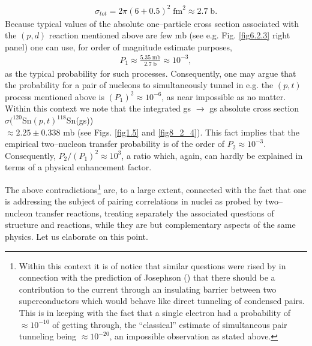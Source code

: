 \begin{align}
\sigma_{tot}=2\pi(6+0.5)^2\;\text{fm}^2\approx 2.7\;\text{b}.
\end{align}
Because typical values of the absolute one--particle cross section associated  with the $(p,d)$ reaction mentioned above are few mb (see e.g. Fig. \ref{fig6.2.3} right panel) one can use, for order of magnitude estimate purposes,  
\begin{align}
P_1\approx\frac{5.35\; \text{mb}}{2.7\;\text{b}}\approx 10^{-3},
\end{align}
as the typical probability for such processes. Consequently, one may argue that the probability for a  pair of nucleons to simultaneously tunnel in e.g. the $(p,t)$ process mentioned above is $(P_1)^2\approx10^{-6}$, as near impossible as no matter. Within this context we note that the integrated gs $\rightarrow$ gs absolute cross section $\sigma(^{120}$Sn$(p,t)^{118}$Sn(gs))\\$\approx 2.25 \pm$0.338 mb (see Figs. \ref{fig1.5} and \ref{fig8_2_4}). This fact implies that the empirical two--nucleon transfer probability is of the order of $P_2\approx 10^{-3}$. Consequently, $P_2/(P_1)^2\approx 10^{3}$, a ratio which, again, can hardly be explained in terms of a physical enhancement factor.


The above contradictions\footnote{Within this context it is of notice that similar questions were rised by \cite{Bardeen:62,Bardeen:61,Pippard:12,Cohen:62,McDonald:01} in connection with the prediction of Josephson (\cite{Josephson:62}) that there should be a contribution to the current through an insulating barrier between two superconductors which would behave like direct tunneling of condensed pairs. This is in keeping with the fact that a single electron had a probability of $\approx 10^{-10}$ of getting through, the ``classical'' estimate of simultaneous pair tunneling being $\approx 10^{-20}$, an impossible observation as stated above.}  are, to a large extent, connected with the fact that one is addressing the subject of pairing correlations in nuclei as probed by two--nucleon transfer reactions, treating separately the associated questions of structure and reactions, while they are but complementary aspects of the same physics. Let us elaborate on this point. 


